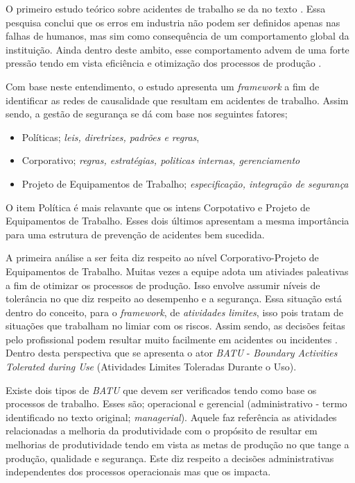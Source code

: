 O primeiro estudo teórico sobre acidentes de trabalho se da no texto \cite{riskoldschool}. Essa pesquisa conclui que os erros em industria não podem ser definidos apenas nas falhas de 
humanos, mas sim como consequência de um comportamento global da instituição. Ainda dentro deste ambito, esse comportamento advem de uma forte pressão tendo em vista eficiência e otimização 
dos processos de produção \cite{riskoldschool} \cite{safety}.

Com base neste entendimento, o estudo \cite{safety} apresenta um \textit{framework} a fim de identificar as redes de causalidade que resultam em acidentes de trabalho. Assim sendo, a gestão de 
segurança se dá com base nos seguintes fatores; 
\begin{itemize}
    \item Políticas; \textit{leis, diretrizes, padrões e regras},
    \item Corporativo; \textit{regras, estratégias, politicas internas, gerenciamento}
    \item Projeto de Equipamentos de Trabalho; \textit{especificação, integração de segurança}
\end{itemize}

O item Política é mais relavante que os intens Corpotativo e Projeto de Equipamentos de Trabalho. Esses dois últimos apresentam a mesma importância para uma estrutura de prevenção de acidentes 
bem sucedida. 

A primeira análise a ser feita diz respeito ao nível Corporativo-Projeto de Equipamentos de Trabalho. Muitas vezes a equipe adota um ativiades paleativas a fim de otimizar os processos 
de produção. Isso envolve assumir níveis de tolerância no que diz respeito ao desempenho e a segurança. Essa situação está dentro do conceito, para o \textit{framework}, de \textit{atividades
limites}, isso pois tratam de situações que trabalham no limiar com os riscos. Assim sendo, as decisões feitas pelo profissional podem resultar muito facilmente em acidentes ou incidentes \cite{safety}. 
Dentro desta perspectiva que se apresenta o ator \textit{BATU} - \textit{Boundary Activities Tolerated during Use} (Atividades Limites Toleradas Durante o Uso).

Existe dois tipos de \textit{BATU} que devem ser verificados tendo como base os processos de trabalho. Esses são; operacional e gerencial (administrativo - termo identificado no texto 
original; \textit{managerial}). Aquele faz referência as atividades relacionadas a melhoria da produtividade com o propósito de resultar em melhorias de produtividade tendo em vista as metas
de produção no que tange a produção, qualidade e segurança. Este diz respeito a decisões administrativas independentes dos processos operacionais mas que os impacta.

